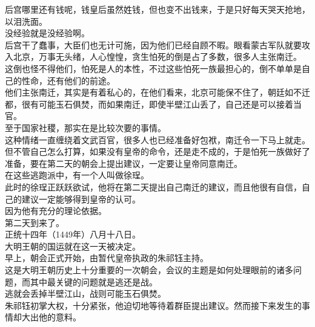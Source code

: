 \begin{multicols}{\theparacolNo}
后宫哪里还有钱呢，钱皇后虽然姓钱，但也变不出钱来，于是只好每天哭天抢地，以泪洗面。\\

没经验就是没经验啊。\\

后宫干了蠢事，大臣们也无计可施，因为他们已经自顾不暇。眼看蒙古军队就要攻入北京，万事无头绪，人心惶惶，贪生怕死的倒是占了多数，很多人主张南迁。\\

这倒也怪不得他们，怕死是人的本性，不过这些怕死一族最担心的，倒不单单是自己的性命，还有他们的前途。\\

他们主张南迁，其实是有着私心的，在他们看来，北京可能保不住了，朝廷如不迁都，很有可能玉石俱焚，而如果南迁，即使半壁江山丢了，自己还是可以接着当官。\\

至于国家社稷，那实在是比较次要的事情。\\

这种情绪一直缠绕着文武百官，很多人也已经准备好包袱，南迁令一下马上就走。\\

但不管自己怎么打算，如果没有皇帝的命令，还是走不成的，于是怕死一族做好了准备，要在第二天的朝会上提出建议，一定要让皇帝同意南迁。\\

在这些逃跑派中，有一个人叫做徐珵。\\

此时的徐珵正跃跃欲试，他将在第二天提出自己南迁的建议，而且他很有自信，自己的建议一定能够得到皇帝的认可。\\

因为他有充分的理论依据。\\

第二天到来了。\\

正统十四年（1449年）八月十八日。\\

大明王朝的国运就在这一天被决定。\\

早上，朝会正式开始，由暂代皇帝执政的朱祁钰主持。\\

这是大明王朝历史上十分重要的一次朝会，会议的主题是如何处理眼前的诸多问题，而其中最关键的问题就是逃还是战。\\

逃就会丢掉半壁江山，战则可能玉石俱焚。\\

朱祁钰初掌大权，十分紧张，他迫切地等待着群臣提出建议。然而接下来发生的事情却大出他的意料。\\


\end{multicols}
